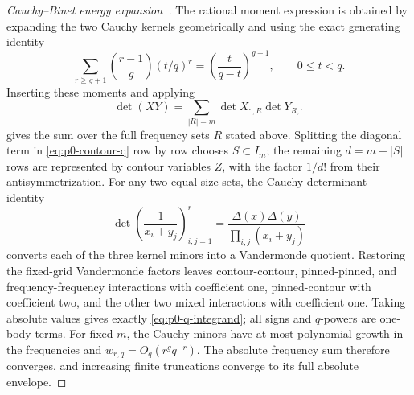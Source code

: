 \begin{proof}[Cauchy--Binet energy expansion~\cite{Gantmacher}]
The rational moment expression is obtained by expanding the two Cauchy kernels
geometrically and using the exact generating identity
\[
 \sum_{r\ge g+1}\binom{r-1}{g}(t/q)^r
       =\left(\frac{t}{q-t}\right)^{g+1},\qquad 0\le t<q.
\]
Inserting these moments and applying
\[
 \det(XY)=\sum_{|R|=m}\det X_{:,R}\det Y_{R,:}
\]
gives the sum over the full frequency sets $R$ stated above.  Splitting the
diagonal term in \eqref{eq:p0-contour-q} row by row chooses
$S\subset I_m$; the remaining $d=m-|S|$ rows are represented by contour
variables $Z$, with the factor $1/d!$ from their antisymmetrization.
For any two equal-size sets, the Cauchy determinant identity~\cite{Krattenthaler}
\[
 \det\left(\frac1{x_i+y_j}\right)_{i,j=1}^r
 =\frac{\Delta(x)\Delta(y)}{\prod_{i,j}(x_i+y_j)}
\]
converts each of the three kernel minors into a Vandermonde quotient.
Restoring the fixed-grid Vandermonde factors leaves contour-contour,
pinned-pinned, and frequency-frequency interactions with coefficient one,
pinned-contour with coefficient two, and the other two mixed interactions
with coefficient one.  Taking absolute values gives exactly
\eqref{eq:p0-q-integrand}; all signs and $q$-powers are one-body terms.
For fixed $m$, the Cauchy minors have at most polynomial growth in the
frequencies and $w_{r,q}=O_q(r^gq^{-r})$.  The absolute frequency sum
therefore converges, and increasing finite truncations converge to its
full absolute envelope.
\end{proof}


